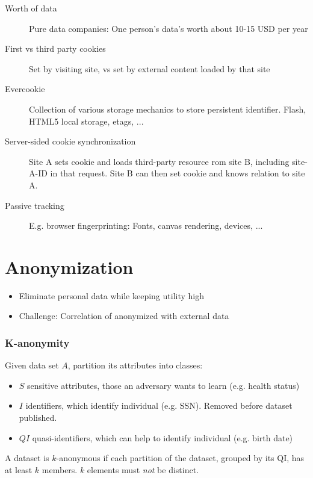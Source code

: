 \documentclass[a4paper]{scrreprt}
\begin{document}
\begin{description}
		\item[Worth of data] Pure data companies: One person's data's worth
				about 10-15 USD per year
		\item[First vs third party cookies] Set by visiting site, vs set by external content loaded by that site
		\item[Evercookie] Collection of various storage mechanics to store
				persistent identifier. Flash, HTML5 local storage, etags, ...
		\item[Server-sided cookie synchronization] Site A sets cookie and loads
				third-party resource rom site B, including site-A-ID in that
				request. Site B can then set cookie and knows relation to site
				A.
		\item[Passive tracking] E.g. browser fingerprinting: Fonts, canvas rendering, devices, ...
\end{description}

\chapter{Anonymization}

\begin{itemize}
		\item Eliminate personal data while keeping utility high
		\item Challenge: Correlation of anonymized with external data
\end{itemize}

\subsection{K-anonymity}

Given data set $A$, partition its attributes into classes:
\begin{itemize}
		\item $S$ sensitive attributes, those an adversary wants to learn (e.g. health status)
		\item $I$ identifiers, which identify individual (e.g. SSN). Removed before dataset published.
		\item $QI$ quasi-identifiers, which can help to identify individual (e.g. birth date)
\end{itemize}

A dataset is $k$-anonymous if each partition of the dataset, grouped by its QI,
has at least $k$ members. $k$ elements must \emph{not} be distinct.
\end{document}
